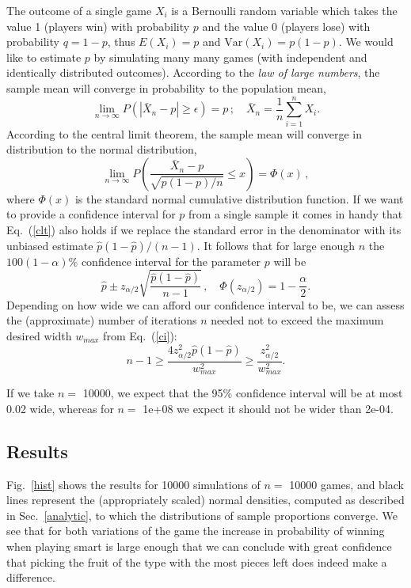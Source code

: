 \documentclass{article}
\newcommand*\mean[1]{\bar{#1}}
\newcommand*\est[1]{\hat{#1}}
\begin{document}
The outcome of a single game \(X_i\) is a Bernoulli random variable which takes the value 1 (players win) with probability \(p\) and the value 0 (players lose) with probability \(q = 1 - p\), thus \(E(X_i) = p\) and \(\mathrm{Var}(X_i) = p(1-p)\). We would like to estimate \(p\) by simulating many many games (with independent and identically distributed outcomes). According to the \emph{law of large numbers}, the sample mean will converge in probability to the population mean,
\[
  \lim_{n \to \infty} P \left(|\mean{X}_n - p| \geq \epsilon\right) = p \, ; \quad       \mean{X}_n = \frac{1}{n} \sum_{i=1}^n X_i.
\]
According to the central limit theorem, the sample mean will converge in distribution to the normal distribution,
\begin{equation}
\label{clt}
  \lim_{n \to \infty} P \left(\frac{\mean{X}_n-p}{\sqrt{p(1-p)/n}} \leq x \right) = \Phi(x) \, ,
\end{equation}
where \(\Phi(x)\) is the standard normal cumulative distribution function. If we want to provide a confidence interval for \(p\) from a single sample it comes in handy that Eq.~(\ref{clt}) also holds if we replace the standard error in the denominator with its unbiased estimate \(\est{p}(1-\est{p})/(n-1)\). It follows that for large enough \(n\) the \(100(1-\alpha)\%\) confidence interval for the parameter \(p\) will be
\begin{equation}
\label{ci}
  \est{p} \pm z_{\alpha/2} \sqrt{\frac{\est{p}(1-\est{p})}{n-1}} \, , \quad \Phi(z_{\alpha/2}) = 1 - \frac{\alpha}{2}.
\end{equation}
Depending on how wide we can afford our confidence interval to be, we can assess the (approximate) number of iterations \(n\) needed not to exceed the maximum desired width \(w_{max}\) from Eq.~(\ref{ci}):
\[
  n-1 \geq \frac{4z_{\alpha/2}^2\est{p}(1-\est{p})}{w_{max}^2} \geq \frac{z_{\alpha/2}^2}{w_{max}^2}.
\]

If we take \(n = \) 10000, we expect that the 95\% confidence interval will be at most 0.02 wide, whereas for \(n = \) 1e+08 we expect it should not be wider than 2e-04.

\subsection{Results}


Fig.~\ref{hist} shows the results for 10000 simulations of \(n = \) 10000 games, and black lines represent the (appropriately scaled) normal densities, computed as described in Sec.~\ref{analytic}, to which the distributions of sample proportions converge. We see that for both variations of the game the increase in probability of winning when playing smart is large enough that we can conclude with great confidence that picking the fruit of the type with the most pieces left does indeed make a difference.
\end{document}
